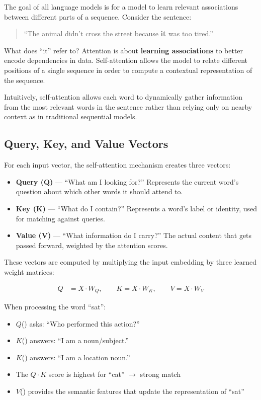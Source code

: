 \documentclass[11pt]{article}
\begin{document}
The goal of all language models is for a model to learn relevant associations between different parts of a sequence. Consider the sentence:

\begin{quote}
``The animal didn't cross the street because \textbf{it} was too tired.''
\end{quote}

\noindent What does ``it'' refer to? Attention is about \textbf{learning associations} to better encode dependencies in data. Self-attention allows the model to relate different positions of a single sequence in order to compute a contextual representation of the sequence.

Intuitively, self-attention allows each word to dynamically gather information from the most relevant words in the sentence rather than relying only on nearby context as in traditional sequential models.

\subsection{Query, Key, and Value Vectors}
\label{sec:qkv}

For each input vector, the self-attention mechanism creates three vectors:

\begin{itemize}[nosep]
  \item \textbf{Query (Q)} --- ``What am I looking for?'' Represents the current word's question about which other words it should attend to.
  \item \textbf{Key (K)} --- ``What do I contain?'' Represents a word's label or identity, used for matching against queries.
  \item \textbf{Value (V)} --- ``What information do I carry?'' The actual content that gets passed forward, weighted by the attention scores.
\end{itemize}

These vectors are computed by multiplying the input embedding by three learned weight matrices:

\begin{align}
  Q &= X \cdot W_Q, \qquad 
  K = X \cdot W_K, \qquad 
  V = X \cdot W_V
\end{align}

\begin{examplebox}
When processing the word ``sat'':

\begin{itemize}[nosep]
  \item $Q$() asks: ``Who performed this action?''
  \item $K$() answers: ``I am a noun/subject.''
  \item $K$() answers: ``I am a location noun.''
  \item The $Q \cdot K$ score is highest for ``cat'' $\rightarrow$ strong match
  \item $V$() provides the semantic features that update the representation of ``sat''
\end{itemize}

\end{examplebox}
\end{document}
